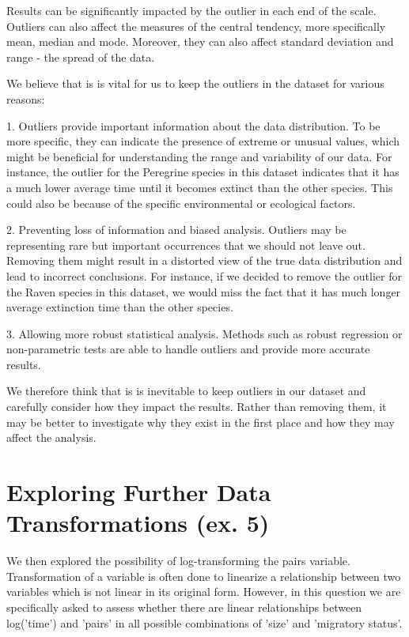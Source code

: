 \documentclass{article}
\begin{document}
Results can be significantly impacted by the outlier in each end of the scale. Outliers can also affect the measures of the central tendency, more specifically mean, median and mode. Moreover, they can also affect standard deviation and range - the spread of the data.

We believe that is is vital for us to keep the outliers in the dataset for various reasons:

1. Outliers provide important information about the data distribution. To be more specific, they can indicate the presence of extreme or unusual values, which might be beneficial for understanding the range and variability of our data. For instance,  the outlier for the Peregrine species in this dataset indicates that it has a much lower average time until it becomes extinct than the other species. This could also be because of the specific environmental or ecological factors.

2. Preventing loss of information and biased analysis. Outliers may be representing rare but important occurrences that we should not leave out. Removing them might result in a distorted view of the true data distribution and lead to incorrect conclusions. For instance, if we decided to remove the outlier for the Raven species in this dataset, we would miss the fact that it has much longer average extinction time than the other species.

3. Allowing more robust statistical analysis. Methods such as robust regression or non-parametric tests are able to handle outliers and provide more accurate results.

We therefore think that is is inevitable to keep outliers in our dataset and carefully consider how they impact the results. Rather than removing them, it may be better to investigate why they exist in the first place and how they may affect the analysis.


\section{Exploring Further Data Transformations (ex. 5)}
We then explored the possibility of log-transforming the pairs variable. Transformation of a variable is often done to linearize a relationship between two variables which is not linear in its original form. However, in this question we are specifically asked to assess whether there are linear relationships between log('time') and 'pairs' in all possible combinations of 'size' and 'migratory status'.
\end{document}

